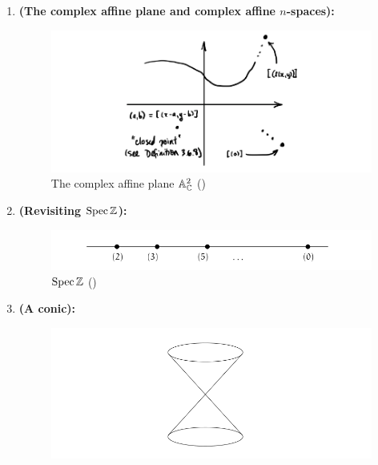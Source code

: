             \begin{example}
                \noindent
                \begin{enumerate}
                    \item \textbf{(The complex affine plane and complex affine $n$-spaces):}
                        \begin{figure}[H]
                            \centering
                            \includegraphics[width=\linewidth,height=\textheight,keepaspectratio]{Figures/complex affine plane.png}
                            \caption{The complex affine plane $\mathbb{A}^2_{\mathbb{C}}$ (\cite[Figure 3.3]{risingsea})}
                            \label{fig: complex_affine_plane}
                        \end{figure}
                    \item \textbf{(Revisiting $\operatorname{Spec} \mathbb{Z}$):}
                        \begin{figure}[H]
                            \centering
                            \includegraphics[width=\linewidth,height=\textheight,keepaspectratio]{Figures/Spec Z.png}
                            \caption{$\operatorname{Spec} \mathbb{Z}$ (\cite[Figure 3.2]{risingsea})}
                            \label{fig: Spec_Z}
                        \end{figure}
                    \item \textbf{(A conic):}
                        \begin{figure}[H]
                            \centering
                            \includegraphics[width=\linewidth,height=\textheight,keepaspectratio]{Figures/conic.png}

\end{figure}
\end{enumerate}
\end{example}
